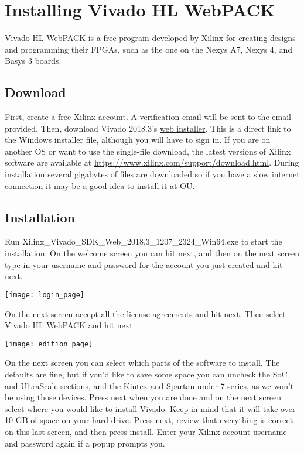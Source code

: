 \section{Installing Vivado HL WebPACK}
Vivado HL WebPACK is a free program developed by Xilinx for creating designs and programming their
FPGAs, such as the one on the Nexys A7, Nexys 4, and Basys 3 boards.

\subsection{Download}
First, create a free \href{https://www.xilinx.com/registration/create-account.html}
{Xilinx account}.
A verification email will be sent to the email provided.
Then, download Vivado 2018.3's
\href{https://www.xilinx.com/member/forms/download/xef-vivado.html?filename=Xilinx_Vivado_SDK_Web_2018.3_1207_2324_Win64.exe}
{web installer}.
This is a direct link to the Windows installer file, although you will have to sign in.
If you are on another OS or want to use the single-file download, the latest versions of Xilinx
software are available at \url{https://www.xilinx.com/support/download.html}.
During installation several gigabytes of files are downloaded so if you have a slow internet
connection it may be a good idea to install it at OU.

\subsection{Installation}
Run Xilinx\_Vivado\_SDK\_Web\_2018.3\_1207\_2324\_Win64.exe to start the installation.
On the welcome screen you can hit next, and then on the next screen type in your username and
password for the account you just created and hit next.

\begin{center}
    \texttt{[image: login\_page]}
\end{center}

On the next screen accept all the license agreements and hit next.
Then select Vivado HL WebPACK and hit next.

\begin{center}
    \texttt{[image: edition\_page]}
\end{center}

On the next screen you can select which parts of the software to install.
The defaults are fine, but if you'd like to save some space you can uncheck the SoC and UltraScale
sections, and the Kintex and Spartan under 7 series, as we won't be using those devices.
Press next when you are done and on the next screen select where you would like to install Vivado.
Keep in mind that it will take over 10 GB of space on your hard drive.
Press next, review that everything is correct on this last screen, and then press install.
Enter your Xilinx account username and password again if a popup prompts you.

